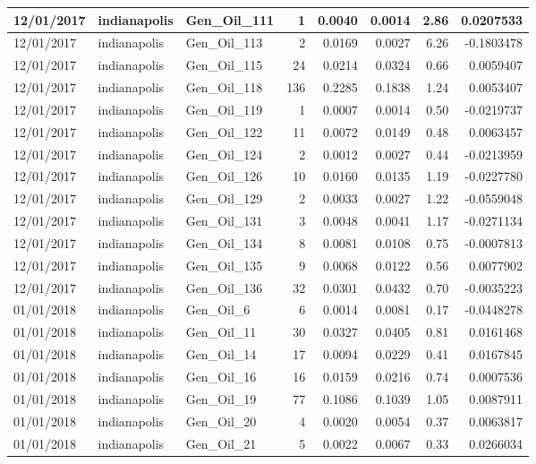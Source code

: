 \documentclass[
  letterpaper,
  DIV=11,
  numbers=noendperiod]{scrartcl}
\begin{document}
\begin{tabular}{l|l|l|r|r|r|r|r}
\hline
12/01/2017 & indianapolis & Gen\_Oil\_111 & 1 & 0.0040 & 0.0014 & 2.86 & 0.0207533\\
\hline
12/01/2017 & indianapolis & Gen\_Oil\_113 & 2 & 0.0169 & 0.0027 & 6.26 & -0.1803478\\
\hline
12/01/2017 & indianapolis & Gen\_Oil\_115 & 24 & 0.0214 & 0.0324 & 0.66 & 0.0059407\\
\hline
12/01/2017 & indianapolis & Gen\_Oil\_118 & 136 & 0.2285 & 0.1838 & 1.24 & 0.0053407\\
\hline
12/01/2017 & indianapolis & Gen\_Oil\_119 & 1 & 0.0007 & 0.0014 & 0.50 & -0.0219737\\
\hline
12/01/2017 & indianapolis & Gen\_Oil\_122 & 11 & 0.0072 & 0.0149 & 0.48 & 0.0063457\\
\hline
12/01/2017 & indianapolis & Gen\_Oil\_124 & 2 & 0.0012 & 0.0027 & 0.44 & -0.0213959\\
\hline
12/01/2017 & indianapolis & Gen\_Oil\_126 & 10 & 0.0160 & 0.0135 & 1.19 & -0.0227780\\
\hline
12/01/2017 & indianapolis & Gen\_Oil\_129 & 2 & 0.0033 & 0.0027 & 1.22 & -0.0559048\\
\hline
12/01/2017 & indianapolis & Gen\_Oil\_131 & 3 & 0.0048 & 0.0041 & 1.17 & -0.0271134\\
\hline
12/01/2017 & indianapolis & Gen\_Oil\_134 & 8 & 0.0081 & 0.0108 & 0.75 & -0.0007813\\
\hline
12/01/2017 & indianapolis & Gen\_Oil\_135 & 9 & 0.0068 & 0.0122 & 0.56 & 0.0077902\\
\hline
12/01/2017 & indianapolis & Gen\_Oil\_136 & 32 & 0.0301 & 0.0432 & 0.70 & -0.0035223\\
\hline
01/01/2018 & indianapolis & Gen\_Oil\_6 & 6 & 0.0014 & 0.0081 & 0.17 & -0.0448278\\
\hline
01/01/2018 & indianapolis & Gen\_Oil\_11 & 30 & 0.0327 & 0.0405 & 0.81 & 0.0161468\\
\hline
01/01/2018 & indianapolis & Gen\_Oil\_14 & 17 & 0.0094 & 0.0229 & 0.41 & 0.0167845\\
\hline
01/01/2018 & indianapolis & Gen\_Oil\_16 & 16 & 0.0159 & 0.0216 & 0.74 & 0.0007536\\
\hline
01/01/2018 & indianapolis & Gen\_Oil\_19 & 77 & 0.1086 & 0.1039 & 1.05 & 0.0087911\\
\hline
01/01/2018 & indianapolis & Gen\_Oil\_20 & 4 & 0.0020 & 0.0054 & 0.37 & 0.0063817\\
\hline
01/01/2018 & indianapolis & Gen\_Oil\_21 & 5 & 0.0022 & 0.0067 & 0.33 & 0.0266034\\

\end{tabular}
\end{document}

